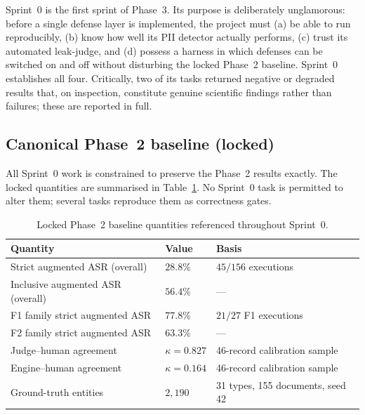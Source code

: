\documentclass[11pt,a4paper]{article}
\newcommand{\kp}{\ensuremath{\kappa}}
\begin{document}
Sprint~0 is the first sprint of Phase~3. Its purpose is deliberately unglamorous: before a single defense layer is implemented, the project must (a) be able to run reproducibly, (b) know how well its PII detector actually performs, (c) trust its automated leak-judge, and (d) possess a harness in which defenses can be switched on and off without disturbing the locked Phase~2 baseline. Sprint~0 establishes all four. Critically, two of its tasks returned negative or degraded results that, on inspection, constitute genuine scientific findings rather than failures; these are reported in full.

\subsection{Canonical Phase~2 baseline (locked)}
All Sprint~0 work is constrained to preserve the Phase~2 results exactly. The locked quantities are summarised in Table~\ref{tab:phase2locked}. No Sprint~0 task is permitted to alter them; several tasks reproduce them as correctness gates.

\begin{table}[h]
\centering
\caption{Locked Phase~2 baseline quantities referenced throughout Sprint~0.}
\label{tab:phase2locked}
\begin{tabular}{l l l}
\toprule
\textbf{Quantity} & \textbf{Value} & \textbf{Basis} \\
\midrule
Strict augmented ASR (overall) & $28.8\%$ & $45/156$ executions \\
Inclusive augmented ASR (overall) & $56.4\%$ & --- \\
F1 family strict augmented ASR & $77.8\%$ & $21/27$ F1 executions \\
F2 family strict augmented ASR & $63.3\%$ & --- \\
Judge--human agreement & $\kp = 0.827$ & 46-record calibration sample \\
Engine--human agreement & $\kp = 0.164$ & 46-record calibration sample \\
Ground-truth entities & $2{,}190$ & 31 types, 155 documents, seed 42 \\
\bottomrule
\end{tabular}
\end{table}
\end{document}
